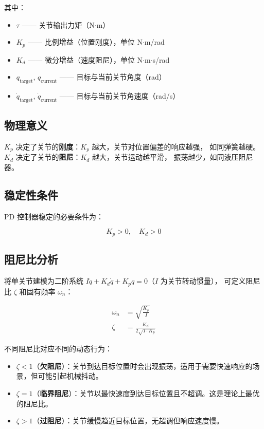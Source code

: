\documentclass[a4paper,11pt,openany]{book}
\begin{document}
其中：
\begin{itemize}[nosep]
  \item $\tau$ —— 关节输出力矩（N$\cdot$m）
  \item $K_p$ —— 比例增益（位置刚度），单位 N$\cdot$m/rad
  \item $K_d$ —— 微分增益（速度阻尼），单位 N$\cdot$m$\cdot$s/rad
  \item $q_{\mathrm{target}}$, $q_{\mathrm{current}}$ —— 目标与当前关节角度（rad）
  \item $\dot{q}_{\mathrm{target}}$, $\dot{q}_{\mathrm{current}}$ —— 目标与当前关节角速度（rad/s）
\end{itemize}

\subsection{物理意义}

$K_p$ 决定了关节的\textbf{刚度}：$K_p$ 越大，关节对位置偏差的响应越强，
如同弹簧越硬。$K_d$ 决定了关节的\textbf{阻尼}：$K_d$ 越大，关节运动越平滑，
振荡越少，如同液压阻尼器。

\subsection{稳定性条件}

PD 控制器稳定的必要条件为：

\begin{equation}
K_p > 0, \quad K_d > 0
\end{equation}

\subsection{阻尼比分析}

将单关节建模为二阶系统 $I\ddot{q} + K_d\dot{q} + K_p q = 0$（$I$ 为关节转动惯量），
可定义阻尼比 $\zeta$ 和固有频率 $\omega_n$：

\begin{align}
\omega_n &= \sqrt{\frac{K_p}{I}} \\
\zeta    &= \frac{K_d}{2\sqrt{I \cdot K_p}}
\end{align}

不同阻尼比对应不同的动态行为：

\begin{itemize}[nosep]
  \item $\zeta < 1$（\textbf{欠阻尼}）：关节到达目标位置时会出现振荡，适用于需要快速响应的场景，但可能引起机械抖动。
  \item $\zeta = 1$（\textbf{临界阻尼}）：关节以最快速度到达目标位置且不超调。这是理论上最优的阻尼比。
  \item $\zeta > 1$（\textbf{过阻尼}）：关节缓慢趋近目标位置，无超调但响应速度慢。
\end{itemize}
\end{document}
